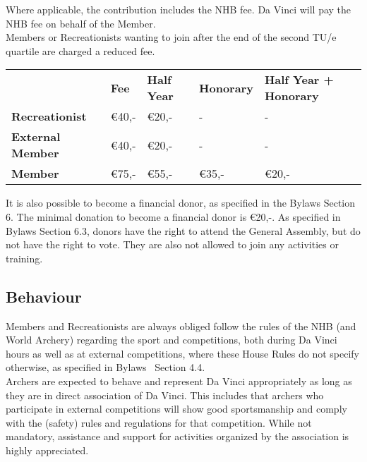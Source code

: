 \documentclass[a4paper]{article}
\newcommand{\Asta}{Bylaws} %
\begin{document}
Where applicable, the contribution includes the { NHB} fee. Da Vinci will pay the { NHB} fee on behalf of the { Member}. \\

{ Members} or { Recreationists} wanting to join after the end of the second { TU/e} quartile are charged a reduced fee. \\


\bigskip
\begin{tabular}{lllll}
                         & \textbf{Fee} & \textbf{Half Year} & \textbf{Honorary} & \textbf{Half Year + Honorary} \\
\textbf{Recreationist}   & €40,-        & €20,-              & -                 & -                             \\
\textbf{External Member} & €40,-        & €20,-              & -                 & -                             \\
\textbf{Member}          & €75,-        & €55,-              & €35,-             & €20,-                        
\end{tabular}

\bigskip

It is also possible to become a financial donor, as specified in the { \Asta} Section 6. The minimal donation to become a financial donor is €20,-. As specified in { \Asta} Section 6.3, donors have the right to attend the { General Assembly}, but do not have the right to vote. They are also not allowed to join any activities or training.

\subsection{Behaviour}
{ Members} and { Recreationists} are always obliged follow the rules of the { NHB} (and World Archery) regarding the sport and competitions, both during Da Vinci hours as well as at external competitions, where these { House Rules} do not specify otherwise, as specified in { \Asta\ } Section 4.4. \\

{ Archers} are expected to behave and represent Da Vinci appropriately as long as they are in direct association of Da Vinci. This includes that { archers} who participate in external competitions will show good sportsmanship and comply with the (safety) rules and regulations for that competition. While not mandatory, assistance and support for activities organized by the association is highly appreciated. \\
\end{document}
